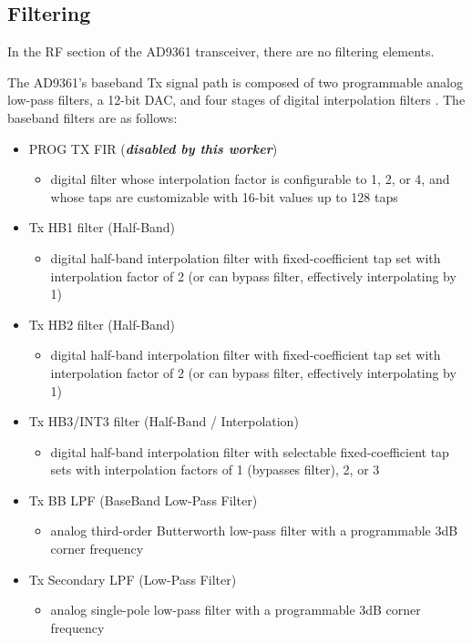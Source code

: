 \documentclass{article}
\begin{document}
\subsection*{Filtering}
In the RF section of the AD9361 transceiver, there are no filtering elements.\par\medskip
\noindent The AD9361's baseband Tx
signal path is composed of two programmable analog low-pass
filters, a 12-bit DAC, and four stages of digital interpolation
filters \cite{adi_ug570}.
\noindent The baseband filters are as follows:
\begin{itemize}
\item PROG TX FIR (\textit{\textbf{disabled by this worker}})
\begin{itemize}
\item digital filter whose interpolation factor is configurable to 1, 2, or 4, and whose taps are customizable with 16-bit values up to 128 taps
\end{itemize}
\item Tx HB1 filter (Half-Band)
\begin{itemize}
\item digital half-band interpolation filter with fixed-coefficient tap set with interpolation factor of 2 (or can bypass filter, effectively interpolating by 1)
\end{itemize}
\item Tx HB2 filter (Half-Band)
\begin{itemize}
\item digital half-band interpolation filter with fixed-coefficient tap set with interpolation factor of 2 (or can bypass filter, effectively interpolating by 1)
\end{itemize}
\item Tx HB3/INT3 filter (Half-Band / Interpolation)
\begin{itemize}
\item digital half-band interpolation filter with selectable fixed-coefficient tap sets with interpolation factors of 1 (bypasses filter), 2, or 3
\end{itemize}
\item Tx BB LPF (BaseBand Low-Pass Filter)
\begin{itemize}
\item analog third-order Butterworth low-pass filter with a programmable 3dB corner frequency
\end{itemize}
\item Tx Secondary LPF (Low-Pass Filter)
\begin{itemize}
\item analog single-pole low-pass filter with a programmable 3dB corner frequency
\end{itemize}
\end{itemize}
\end{document}
